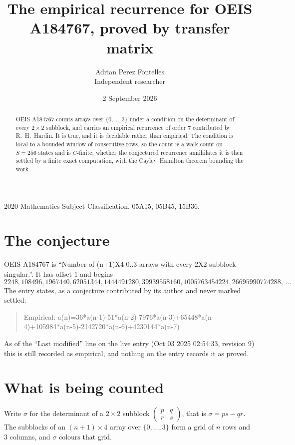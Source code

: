 \documentclass[11pt,a4paper]{article}
\title{The empirical recurrence for OEIS A184767, proved by transfer matrix}
\author{Adrian Perez Fontelles\\ \small Independent researcher}
\date{2 September 2026}
\theoremstyle{plain}
\theoremstyle{definition}
\begin{document}
\maketitle

\begin{abstract}
OEIS A184767 counts arrays over $\{0,\dots,3\}$ under a condition on the determinant of every
$2\times2$ subblock, and carries an empirical recurrence of order $7$ contributed by
R.~H.~Hardin. It is true, and it is decidable rather than empirical. The condition is local to
a bounded window of consecutive rows, so the count is a walk count on $S=256$ states and is
$C$-finite; whether the conjectured recurrence annihilates it is then settled by a finite exact
computation, with the Cayley--Hamilton theorem bounding the work.
\end{abstract}

\noindent\small 2020 Mathematics Subject Classification. 05A15, 05B45, 15B36.\normalsize

\section{The conjecture}

OEIS A184767 is ``Number of (n+1)X4 0..3 arrays with every 2X2 subblock singular.''. It has offset $1$ and begins
\[
2248, 108496, 1967440, 62051344, 1444491280, 39939558160, 1005763454224, 26695990774288,\ \dots
\]
The entry states, as a conjecture contributed by its author and never marked settled:
\begin{quote}
Empirical: a(n)=36*a(n-1)-51*a(n-2)-7976*a(n-3)+65448*a(n-4)+105984*a(n-5)-2142720*a(n-6)+4230144*a(n-7)
\end{quote}
As of the ``Last modified'' line on the live entry (Oct 03 2025 02:54:33, revision 9) this is still
recorded as empirical, and nothing on the entry records it as proved.

\section{What is being counted}

Write $\sigma$ for the determinant of a $2\times2$ subblock
$\begin{pmatrix}p&q\\r&s\end{pmatrix}$, that is $\sigma=ps-qr$. The subblocks of an
$(n+1)\times4$ array over $\{0,\dots,3\}$ form a grid of $n$ rows and $3$
columns, and $\sigma$ colours that grid.
\end{document}
